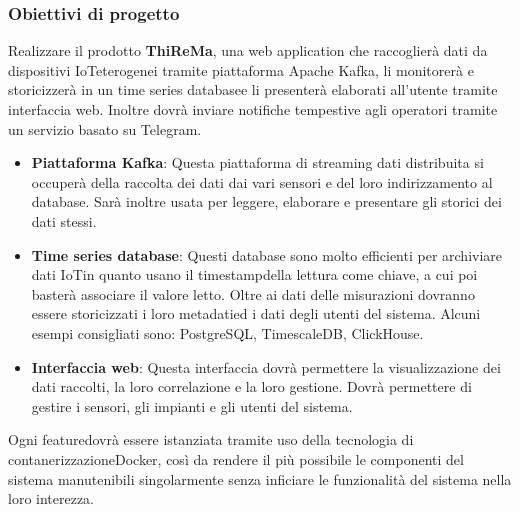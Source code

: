 \subsubsection{Obiettivi di progetto}
Realizzare il prodotto \textbf{ThiReMa}, una web application che raccoglierà dati da dispositivi IoT\glosp eterogenei tramite piattaforma Apache Kafka, li monitorerà e storicizzerà in un time series database\glosp e li presenterà elaborati all'utente tramite interfaccia web. Inoltre dovrà inviare notifiche tempestive agli operatori tramite un servizio basato su Telegram\glo.
\begin{itemize}
	\item \textbf{Piattaforma Kafka}: Questa piattaforma di streaming dati distribuita si occuperà della raccolta dei dati dai vari sensori e del loro indirizzamento al database. Sarà inoltre usata per leggere, elaborare e presentare gli storici dei dati stessi.
	\item \textbf{Time series database}: Questi database sono molto efficienti per archiviare dati IoT\glosp in quanto usano il timestamp\glosp della lettura come chiave, a cui poi basterà associare il valore letto. Oltre ai dati delle misurazioni dovranno essere storicizzati i loro metadati\glosp ed i dati degli utenti del sistema.
	Alcuni esempi consigliati sono: PostgreSQL\glo, TimescaleDB\glo, ClickHouse\glo.
	\item \textbf{Interfaccia web}: Questa interfaccia dovrà permettere la visualizzazione dei dati raccolti, la loro correlazione e la loro gestione. Dovrà permettere di gestire i sensori, gli impianti e gli utenti del sistema.
\end{itemize} 
Ogni feature\glosp dovrà essere istanziata tramite uso della tecnologia di contanerizzazione\glosp Docker\glo, così da rendere il più possibile le componenti del sistema manutenibili singolarmente senza inficiare le funzionalità del sistema nella loro interezza.


